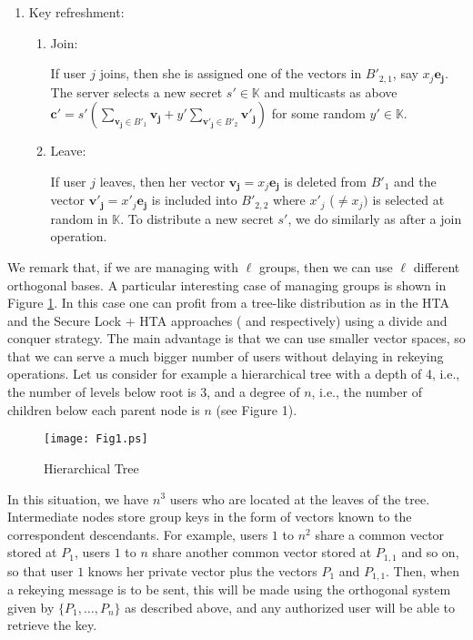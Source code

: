 \documentclass[a4paper,11pt]{amsart}
\theoremstyle{definition}
\newcommand{\K}{\mathbb{K}}
\begin{document}
\begin{enumerate}
\item Key refreshment:

  \begin{enumerate}

  \item Join:

If user $j$ joins, then she is assigned one of the vectors in
    $B'_{2,1}$, say $x_j\mathbf{e_j} $. The server selects a new
    secret $s'\in \K$ and multicasts as above $\mathbf{c'}
    =s'(\sum_{\mathbf{v_j}\in
      B'_1}\mathbf{v_j}+y'\sum_{\mathbf{v'_j}\in B'_2}\mathbf{v'_j} )$
    for some random $y'\in \K$.

  \item Leave:

    If user $j$ leaves, then her vector $\mathbf{v_j} =x_j\mathbf{e_j}
    $ is deleted from $B'_1$ and the vector
    $\mathbf{v'_j}=x'_j\mathbf{e_j}$ is included into $B'_{2,2}$ where
    $x'_j$ ($\neq x_j)$ is selected at random in $\K$. To distribute a
    new secret $s'$, we do similarly as after a join
    operation. 

  \end{enumerate}

\end{enumerate}


We remark that, if we are managing with $\ell$ groups, then we can use
$\ell$ different orthogonal bases.  A particular interesting case of
managing groups is shown in Figure \ref{fig:tree}. In this case one
can profit from a tree-like distribution as in the HTA and the Secure
Lock + HTA approaches (\cite{RFC:2627} and \cite{1039707}
respectively) using a divide and conquer
strategy. The main advantage is that we can use smaller vector spaces, so that
we can serve a much bigger number of users without delaying in
rekeying operations. Let us consider for example a hierarchical tree with a depth of 4,
i.e., the number of levels below root is 3, and a degree of $n$, i.e.,
the number of children below each parent node is $n$ (see Figure 1).
\begin{figure}
  \begin{center}

\texttt{[image: Fig1.ps]}
\caption{Hierarchical Tree}
    \label{fig:tree}
\end{center}
\end{figure}
In this situation, we have $n^3$ users who are located at the leaves
of the tree. Intermediate nodes store group keys in the form of
vectors known to the correspondent descendants. For example, users $1$
to $n^2$ share a common vector stored at $P_1$, users $1$ to $n$ share
another common vector stored at $P_{1,1}$ and so on, so that user $1$
knows her private vector plus the vectors $P_{1}$ and $P_{1,1}$. Then,
when a rekeying message is to be sent, this will be made using the
orthogonal system given by $\{ P_1, \dots ,P_n \}$ as described above,
and any authorized user will be able to retrieve the key.
\end{document}
